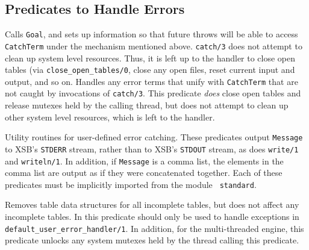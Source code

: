 %
%
%
%

\subsection{Predicates to Handle Errors}

\begin{description}
  
Calls {\tt Goal}, and sets up information so that future throws will
be able to access {\tt CatchTerm} under the mechanism mentioned
above. {\tt catch/3} does not attempt to clean up system level
resources.   Thus, it is left up to the handler to close open tables
(via {\tt close\_open\_tables/0}, close any open files, reset current
input and output, and so on.
%
 Handles any error
terms that unify with {\tt CatchTerm} that are not caught by
invocations of {\tt catch/3}.  This predicate {\em does} close open
tables and release mutexes held by the calling thread, but does not
attempt to clean up other system level resources, which is left to the
handler.
%
\vspace{-0.3in}

Utility routines for user-defined error catching.  These predicates
output {\tt Message} to XSB's {\tt STDERR} stream, rather than to
XSB's {\tt STDOUT} stream, as does {\tt write/1} and {\tt writeln/1}.
In addition, if {\tt Message} is a comma list, the elements in the
comma list are output as if they were concatenated together.  Each of
these predicates must be implicitly imported from the module {\tt
standard}.

%
Removes table data structures for all incomplete tables, but does not
affect any incomplete tables.  In \version{} this predicate should
only be used to handle exceptions in {\tt
  default\_user\_error\_handler/1}.  In addition, for the
multi-threaded engine, this predicate unlocks any system mutexes held
by the thread calling this predicate.

\end{description}


